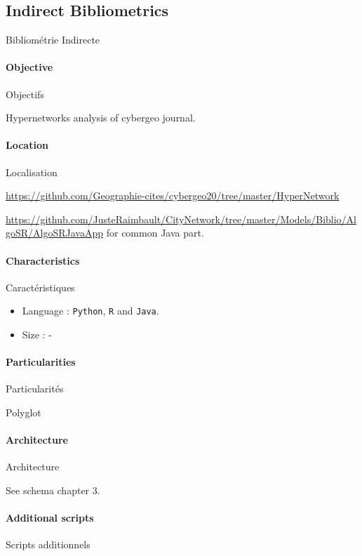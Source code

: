 

\subsection{Indirect Bibliometrics}{Bibliométrie Indirecte}

\paragraph{Objective}{Objectifs}

Hypernetworks analysis of cybergeo journal.

\paragraph{Location}{Localisation}

\url{https://github.com/Geographie-cites/cybergeo20/tree/master/HyperNetwork}

\url{https://github.com/JusteRaimbault/CityNetwork/tree/master/Models/Biblio/AlgoSR/AlgoSRJavaApp} for common Java part.

\paragraph{Characteristics}{Caractéristiques}

\begin{itemize}
\item Language : \texttt{Python}, \texttt{R} and \texttt{Java}.
\item Size : -
\end{itemize}


\paragraph{Particularities}{Particularités}

Polyglot 

\paragraph{Architecture}{Architecture}

See schema chapter 3.

\paragraph{Additional scripts}{Scripts additionnels}

